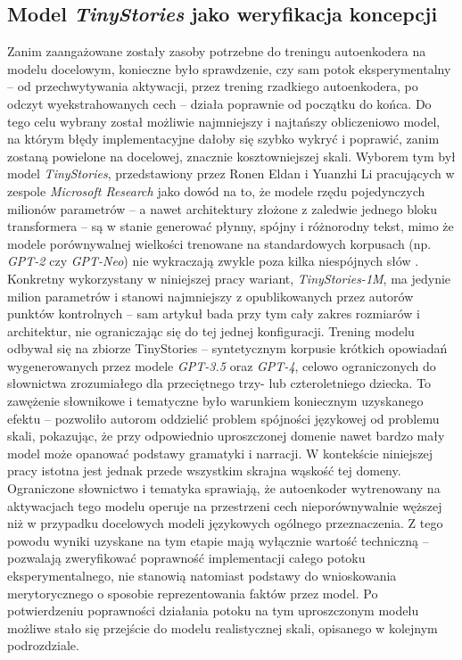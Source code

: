  \subsection{Model \textit{TinyStories} jako weryfikacja koncepcji}
  Zanim zaangażowane zostały zasoby potrzebne do treningu autoenkodera na modelu docelowym, konieczne było sprawdzenie, czy sam potok eksperymentalny -- od przechwytywania aktywacji, przez trening rzadkiego autoenkodera, po odczyt wyekstrahowanych cech -- działa poprawnie od początku do końca. Do tego celu wybrany został możliwie najmniejszy i najtańszy obliczeniowo model, na którym błędy implementacyjne dałoby się szybko wykryć i poprawić, zanim zostaną powielone na docelowej, znacznie kosztowniejszej skali. Wyborem tym był model \textit{TinyStories}, przedstawiony przez Ronen Eldan i Yuanzhi Li pracujących w zespole \textit{Microsoft Research} jako dowód na to, że modele rzędu pojedynczych milionów parametrów -- a nawet architektury złożone z zaledwie jednego bloku transformera -- są w stanie generować płynny, spójny i różnorodny tekst, mimo że modele porównywalnej wielkości trenowane na standardowych korpusach (np. \textit{GPT-2} czy \textit{GPT-Neo}) nie wykraczają zwykle poza kilka niespójnych słów \cite{eldan_2023_tinystories_small_language_models}. Konkretny wykorzystany w niniejszej pracy wariant, \textit{TinyStories-1M}, ma jedynie milion parametrów i stanowi najmniejszy z opublikowanych przez autorów punktów kontrolnych -- sam artykuł bada przy tym cały zakres rozmiarów i architektur, nie ograniczając się do tej jednej konfiguracji. \newline
  Trening modelu odbywał się na zbiorze TinyStories -- syntetycznym korpusie krótkich opowiadań wygenerowanych przez modele \textit{GPT-3.5} oraz \textit{GPT-4}, celowo ograniczonych do słownictwa zrozumiałego dla przeciętnego trzy- lub czteroletniego dziecka. To zawężenie słownikowe i tematyczne było warunkiem koniecznym uzyskanego efektu -- pozwoliło autorom oddzielić problem spójności językowej od problemu skali, pokazując, że przy odpowiednio uproszczonej domenie nawet bardzo mały model może opanować podstawy gramatyki i narracji. \newline
  W kontekście niniejszej pracy istotna jest jednak przede wszystkim skrajna wąskość tej domeny. Ograniczone słownictwo i tematyka sprawiają, że autoenkoder wytrenowany na aktywacjach tego modelu operuje na przestrzeni cech nieporównywalnie węższej niż w przypadku docelowych modeli językowych ogólnego przeznaczenia. Z tego powodu wyniki uzyskane na tym etapie mają wyłącznie wartość techniczną -- pozwalają zweryfikować poprawność implementacji całego potoku eksperymentalnego, nie stanowią natomiast podstawy do wnioskowania merytorycznego o sposobie reprezentowania faktów przez model. Po potwierdzeniu poprawności działania potoku na tym uproszczonym modelu możliwe stało się przejście do modelu realistycznej skali, opisanego w kolejnym podrozdziale.


